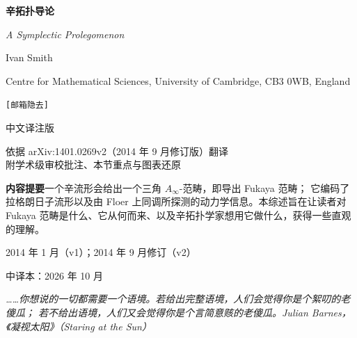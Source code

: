 
\begin{titlepage}
\centering
\vspace*{2.2cm}

{\Huge\bfseries 辛拓扑导论\par}
\vspace{0.9em}
{\Large\itshape A Symplectic Prolegomenon\par}

\vspace{2.2em}
{\large Ivan Smith\par}
\vspace{0.4em}
{\small Centre for Mathematical Sciences, University of Cambridge, CB3 0WB, England\par}
\vspace{0.3em}
{\small\texttt{[邮箱隐去]}\par}

\vspace{2.6em}
\begin{minipage}{0.78\textwidth}
\centering
{\large 中文译注版\par}
\vspace{0.6em}
{\small 依据 arXiv:1401.0269v2（2014 年 9 月修订版）翻译\\
附学术级审校批注、本节重点与图表还原\par}
\end{minipage}

\vspace{2.4em}
\begin{minipage}{0.82\textwidth}
\small
\noindent\textbf{内容提要}\quad 一个辛流形会给出一个三角 $A_\infty$-范畴，即导出 Fukaya 范畴；
它编码了拉格朗日子流形以及由 Floer 上同调所探测的动力学信息。本综述旨在让读者对
Fukaya 范畴是什么、它从何而来、以及辛拓扑学家想用它做什么，获得一些直观的理解。
\end{minipage}

\vfill
{\small 2014 年 1 月（v1）；2014 年 9 月修订（v2）\par}
\vspace{0.4em}
{\small 中译本：2026 年 10 月\par}
\end{titlepage}

\thispagestyle{empty}
\vspace*{0.28\textheight}
\begin{epigraph}{\itshape
……你想说的一切都需要一个语境。若给出完整语境，人们会觉得你是个絮叨的老傻瓜；
若不给出语境，人们又会觉得你是个言简意赅的老傻瓜。}{\itshape Julian Barnes，《凝视太阳》（Staring at the Sun）}
\end{epigraph}

